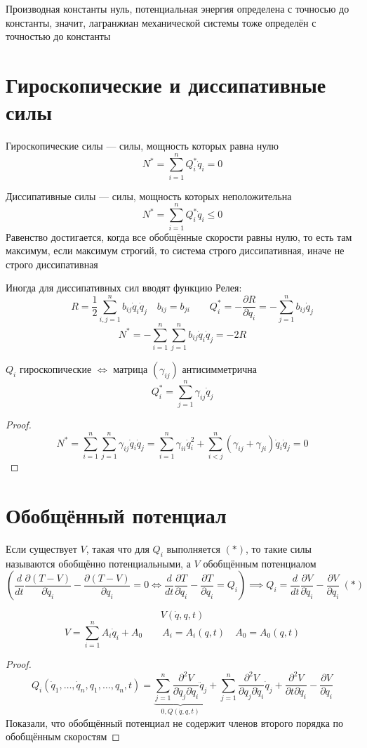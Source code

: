 \documentclass[crop=false]{standalone}
\begin{document}
Производная константы нуль, потенциальная энергия определена с точносью до константы, значит, лагранжиан механической системы тоже определён с точностью до константы

\section{Гироскопические и диссипативные силы}
\Def Гироскопические силы — силы, мощность которых равна нулю
\[N^* = \sum_{i=1}^{n} Q_i^* \dot q_i = 0\]

\Def Диссипативные силы — силы, мощность которых неположительна
\[N^* = \sum_{i=1}^{n} Q_i^* \dot q_i \le 0\]
Равенство достигается, когда все обобщённые скорости равны нулю, то есть там максимум, если максимум строгий, то система строго диссипативная, иначе не строго диссипативная

Иногда для диссипативных сил вводят функцию Релея:
\[\qquad R = \frac{1}{2} \sum_{i, j=1}^{n} b_{i j} \dot q_i \dot q_j \quad b_{i j} = b_{j i} \qquad Q_i^* = - \frac{\partial R}{\partial \dot q_i}  = -\sum_{j=1}^{n} b_{i j} \dot q_j\]
\[N^* = - \sum_{i=1}^n \sum_{j=1}^n b_{i j} \dot q_i \dot q_j = - 2 R\]

\keypoint $Q_i$ гироскопические $\iff$ матрица $(\gamma_{i j})$ антисимметрична
\[Q_i^* = \sum_{j=1}^{n} \gamma_{i j} \dot q_j\]
\begin{proof}
    \[N^* = \sum_{i=1}^n \sum_{j=1}^{n} \gamma_{i j} \dot q_i \dot q_j = \sum_{i=1}^{n} \gamma_{i i} \dot q_i^2 + \sum_{i < j}^{n} (\gamma_{i j} + \gamma_{j i}) \dot q_i \dot q_j = 0\]
\end{proof}

\section{Обобщённый потенциал}
\Def Если существует $V$, такая что для $Q_i$ выполняется $(*)$, то такие силы называются обобщённо потенциальными, а $V$ обобщённым потенциалом
\[\left(\frac{d}{d t} \frac{\partial ( T - V)}{\partial \dot q_i} - \frac{\partial (T - V)}{\partial q_i} = 0 \iff \frac{d}{d t} \frac{\partial T}{\partial \dot q_i} - \frac{\partial T}{\partial q_i} = Q_i \right)\implies Q_i = \frac{d }{d t} \frac{\partial V}{\partial \dot q_i} - \frac{\partial V}{\partial q_i} \:(*)\]

\[V(\dot q, q, t)\]
\noindent \keypoint 
\[ V = \sum_{i= 1}^{n} A_i \dot q_i + A_0 \qquad A_i = A_i(q, t) \quad A_0 = A_0(q, t) \]
\begin{proof}
\[Q_i (\dot q_1, \dots , \dot q_n , q_1 , \dots, q_n , t) = \underbrace{\sum_{j=1}^{n} \frac{\partial ^2 V}{\partial \dot q_j \partial \dot q_i} \ddot q_j}_{0 , Q(\dot q, q, t)} + \sum_{j=1}^{n} \frac{\partial ^2 V}{\partial q_j  \partial \dot q_i} \dot q_j + \frac{\partial^2 V}{\partial t \partial \dot q_i } - \frac{\partial V}{\partial q_i}\]
Показали, что обобщённый потенциал не содержит членов второго порядка по обобщённым скоростям 
\end{proof}
    
\end{document}
